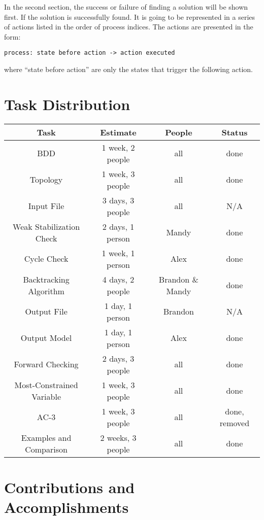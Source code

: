 In the second section, the success or failure of finding a solution will be shown first. If the solution is successfully found. It is going to be represented in a series of actions listed in the order of process indices. The actions are presented in the form: 
\begin{center}
\texttt{process: state before action -> action executed}
\end{center}
where ``state before action'' are only the states that trigger the following action. 

\section{Task Distribution}

\begin{center}
\begin{tabular}{|c||c|c|c|}
\hline
 Task & Estimate & People & Status \\
\hline
 BDD & 1 week, 2 people & all & done \\
 Topology & 1 week, 3 people & all & done \\
 Input File & 3 days, 3 people & all & N/A \\
 Weak Stabilization Check & 2 days, 1 person & Mandy & done \\
 Cycle Check & 1 week, 1 person & Alex & done \\
 Backtracking Algorithm & 4 days, 2 people & Brandon \& Mandy & done \\
 Output File & 1 day, 1 person &  Brandon & N/A \\
 Output Model & 1 day, 1 person & Alex & done \\
 Forward Checking & 2 days, 3 people & all & done \\
 Most-Constrained Variable & 1 week, 3 people & all & done \\
 AC-3 & 1 week, 3 people & all & done, removed \\
 Examples and Comparison & 2 weeks, 3 people & all & done \\
\hline
\end{tabular}
\end{center}

\section{Contributions and Accomplishments}

